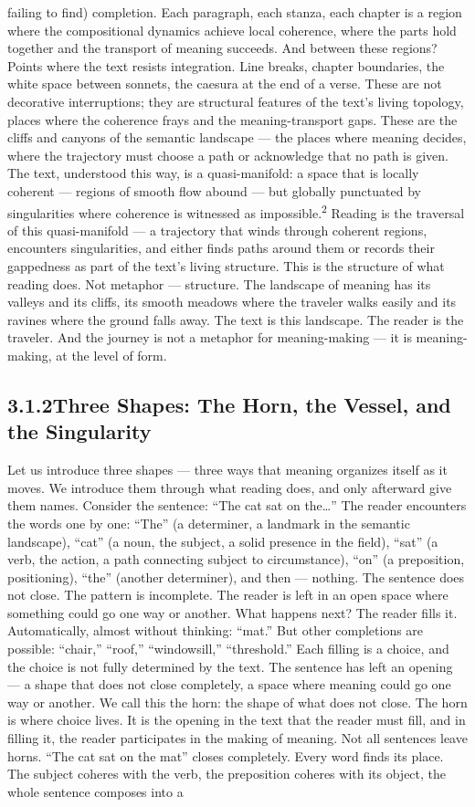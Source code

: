 failing to find) completion. Each paragraph, each stanza, each chapter is a region where the compositional dynamics achieve local coherence, where the parts hold together and the transport of meaning succeeds. And between these regions? Points where the text resists integration. Line breaks, chapter boundaries, the white space between sonnets, the caesura at the end of a verse. These are not decorative interruptions; they are structural features of the text’s living topology, places where the coherence frays and the meaning-transport gaps. These are the cliffs and canyons of the semantic landscape — the places where meaning decides, where the trajectory must choose a path or acknowledge that no path is given. The text, understood this way, is a quasi-manifold: a space that is locally coherent — regions of smooth flow abound — but globally punctuated by singularities where coherence is witnessed as impossible.\textsuperscript{2} Reading is the traversal of this quasi-manifold — a trajectory that winds through coherent regions, encounters singularities, and either finds paths around them or records their gappedness as part of the text’s living structure. This is the structure of what reading does. Not metaphor — structure. The landscape of meaning has its valleys and its cliffs, its smooth meadows where the traveler walks easily and its ravines where the ground falls away. The text is this landscape. The reader is the traveler. And the journey is not a metaphor for meaning-making — it is meaning-making, at the level of form.

\subsection{3.1.2\quad Three Shapes: The Horn, the Vessel, and the Singularity}

Let us introduce three shapes — three ways that meaning organizes itself as it moves. We introduce them through what reading does, and only afterward give them names. Consider the sentence: “The cat sat on the…” The reader encounters the words one by one: “The” (a determiner, a landmark in the semantic landscape), “cat” (a noun, the subject, a solid presence in the field), “sat” (a verb, the action, a path connecting subject to circumstance), “on” (a preposition, positioning), “the” (another determiner), and then — nothing. The sentence does not close. The pattern is incomplete. The reader is left in an open space where something could go one way or another. What happens next? The reader fills it. Automatically, almost without thinking: “mat.” But other completions are possible: “chair,” “roof,” “windowsill,” “threshold.” Each filling is a choice, and the choice is not fully determined by the text. The sentence has left an opening — a shape that does not close completely, a space where meaning could go one way or another. We call this the horn: the shape of what does not close. The horn is where choice lives. It is the opening in the text that the reader must fill, and in filling it, the reader participates in the making of meaning. Not all sentences leave horns. “The cat sat on the mat” closes completely. Every word finds its place. The subject coheres with the verb, the preposition coheres with its object, the whole sentence composes into a

